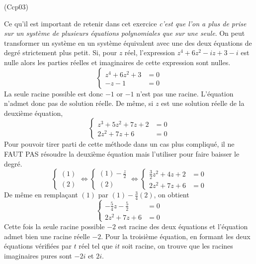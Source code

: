 \begin{tiny}(Ccp03)\end{tiny} Ce qu'il est important de retenir dans cet exercice \emph{c'est que l'on a plus de prise sur un système de plusieurs équations polynomiales que sur une seule}. On peut transformer un système en un système équivalent avec une des deux équations de degré strictement plus petit.\newline
Si, pour $z$ réel, l'expression $z^{4}+6z^{2}-iz+3-i$ est nulle alors les parties réelles et imaginaires de cette expression sont nulles.
\begin{displaymath}
 \left\lbrace 
\begin{aligned}
z^{4}+6z^{2}+3 &= 0\\
-z -1 &= 0
\end{aligned}
\right. 
\end{displaymath}
La seule racine possible est donc $-1$ or $-1$ n'est pas une racine. L'équation n'admet donc pas de solution réelle.\newline
De même, si $z$ est une solution réelle de la deuxième équation,
\begin{displaymath}
 \left\lbrace 
\begin{aligned}
z^3+ 5z^2+7z+2 &= 0 \\
2z^2 +7z +6 &= 0
\end{aligned}
\right. 
\end{displaymath}
Pour pouvoir tirer parti de cette méthode dans un cas plus compliqué, il ne FAUT PAS résoudre la deuxième équation mais l'utiliser pour faire baisser le degré.
\begin{displaymath}
 \left\lbrace 
\begin{aligned}
(1)\\ (2)\end{aligned}
\right. 
\Leftrightarrow
 \left\lbrace 
\begin{aligned}
(1)-\frac{z}{2}\\ (2)\end{aligned}
\right. 
\Leftrightarrow
 \left\lbrace 
\begin{aligned}
\frac{3}{2}z^2+4z+2 &=0\\ 2z^2 +7z +6 &= 0\end{aligned}
\right. 
\end{displaymath}
 De même en remplaçant $(1)$ par $(1)-\frac{3}{4}(2)$, on obtient
\begin{displaymath}
 \left\lbrace 
\begin{aligned}
-\frac{5}{4}z-\frac{5}{2} &= 0 \\
2z^2 +7z +6 &= 0
\end{aligned}
\right. 
\end{displaymath}
Cette fois la seule racine possible $-2$ est racine des deux équations et l'équation admet bien une racine réelle $-2$.\newline
Pour la troisième équation, en formant les deux équations vérifiées par $t$ réel tel que $it$ soit racine, on trouve que les racines imaginaires pures sont $-2i$ et $2i$. 
